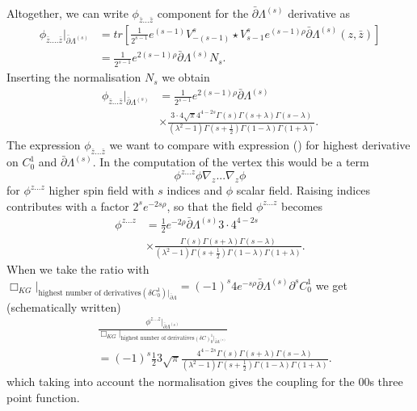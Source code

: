 \documentclass[prd,superscriptaddress,twocolumn,10pt]{revtex4}
\begin{document}
Altogether, we can write $\phi_{\bar{z}...\bar{z}}$ component for the $\bar{\partial}\Lambda^{(s)}$ derivative as
\small
\begin{align}
\phi_{\bar{z}....\bar{z}}|_{\bar{\partial}\Lambda^{(s)}}&=tr\left[\frac{1}{2^{s-1}}e^{(s-1)}V^s_{-(s-1)}\star V^s_{s-1}e^{(s-1)\rho}\bar{\partial}\Lambda^{(s)}(z,\bar{z})\right]\\
&=\frac{1}{2^{s-1}}e^{2(s-1)\rho}\bar{\partial}\Lambda^{(s)} N_s.
\end{align}
\normalsize
Inserting the normalisation $N_s$ we obtain
\begin{align}\nonumber
\phi_{\bar{z}...\bar{z}}|_{\bar{\partial}\Lambda^{(s)}}&=\frac{1}{2^{s-1}}e^{2(s-1)\rho}\bar{\partial}\Lambda^{(s)}\\&\times
\frac{3\cdot 4 \sqrt{\pi}4^{4-2s}\Gamma(s)\Gamma(s+\lambda)\Gamma(s-\lambda)}{(\lambda^2-1)\Gamma(s+\frac{1}{2})\Gamma(1-\lambda)\Gamma(1+\lambda)}.
\end{align}
The expression $\phi_{\bar{z}...\bar{z}}$ we want to compare with expression () for highest derivative on $C_0^1$ and $\bar{\partial}\Lambda^{(s)}$. 
In the computation of the vertex this would be a term 
\begin{equation}
\phi^{z...z}\mathcal{\phi}\nabla_z...\nabla_{z}\mathcal{\phi}
\end{equation}
for $\phi^{z...z}$ higher spin field with $s$ indices and $\mathcal{\phi}$ scalar field. Raising indices
 contributes with a factor $2^se^{-2s\rho}$, so that the field $\phi^{z...z}$ becomes
\begin{align}
\phi^{z...z}&=\frac{1}{2}e^{-2\rho}\bar{\partial}{\Lambda}^{(s)}3\cdot4^{4-2s}\nonumber \\ &\times
\frac{\Gamma(s)\Gamma(s+\lambda)\Gamma(s-\lambda)}{(\lambda^2-1)\Gamma(s+\frac{1}{2})\Gamma(1-\lambda)\Gamma(1+\lambda)}.
\end{align}
When  we take the ratio with $\Box_{KG}|_{\text{highest number of derivatives}(\delta C_0^1)|_{\bar{\partial}\Lambda}}=(-1)^s4e^{-s\rho}\bar{\partial}\Lambda^{(s)}\partial^sC_0^1$ we get (schematically written)
\begin{align}
&\frac{\phi^{z...z}|_{\bar{\partial}\Lambda^{(s)}}}{\Box_{KG}|_{\text{highest number of derivatives}(\delta C)_0^1|_{\bar{\partial}\Lambda^{(s)}}}}\nonumber\\&=(-1)^s\frac{1}{2}3\sqrt{\pi}\frac{4^{4-2s}\Gamma(s)\Gamma(s+\lambda)\Gamma(s-\lambda)}{(\lambda^2-1)\Gamma(s+\frac{1}{2})\Gamma(1-\lambda)\Gamma(1+\lambda)}.
\end{align}
which taking into account the normalisation gives the coupling for the 00s three point function.
\end{document}
